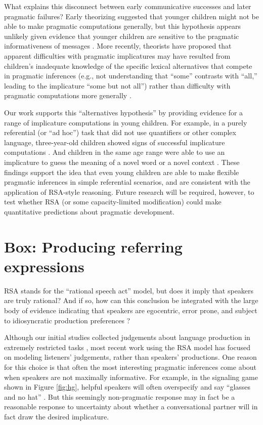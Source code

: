 \documentclass[]{elsarticle}
\begin{document}
What explains this disconnect between early communicative successes and
later pragmatic failures? Early theorizing suggested that younger
children might not be able to make pragmatic computations generally, but this hypothesis appears unlikely given evidence that
younger children are sensitive to the pragmatic informativeness of
messages \citep{katsos2011,oneill2001}. More
recently, theorists have proposed that apparent difficulties with
pragmatic implicatures may have resulted from children's inadequate
knowledge of the specific lexical alternatives that compete in pragmatic
inferences (e.g., not understanding that ``some'' contrasts with
``all,'' leading to the implicature ``some but not all'') rather than
difficulty with pragmatic computations more generally \citep{barner2011}.

Our work supports this ``alternatives hypothesis'' by providing evidence
for a range of implicature computations in young children. For example,
in a purely referential (or ``ad hoc'') task that did not use
quantifiers or other complex language, three-year-old children showed
signs of successful implicature computations \citep{stiller2015}. And children in the same age range were able to use an
implicature to guess the meaning of a novel word \citep{frank2014} or a novel context \citep{horowitz2016}. These findings support the idea that even young children are able
to make flexible pragmatic inferences in simple referential scenarios,
and are consistent with the application of RSA-style reasoning. Future
research will be required, however, to test whether RSA (or some
capacity-limited modification) could make quantitative predictions about
pragmatic development.

\section{Box: Producing referring expressions}\label{box-producing-referring-expressions}

RSA stands for the ``rational speech act'' model, but does it imply that
speakers are truly rational? And if so, how can this conclusion be
integrated with the large body of evidence indicating that speakers are
egocentric, error prone, and subject to idiosyncratic production
preferences \citep{keysar2003,lane2008,gatt2013}?

Although our initial studies collected judgements about language
production in extremely restricted tasks \citep{frank2012}, most
recent work using the RSA model has focused on modeling listeners'
judgements, rather than speakers' productions. One reason for this
choice is that often the most interesting pragmatic inferences come
about when speakers are not maximally informative. For example, in the
signaling game shown in Figure \ref{fig:hg}, helpful speakers will often
overspecify and say ``glasses and no hat'' \citep{bauman2014}. But this seemingly non-pragmatic response may in fact be a
reasonable response to uncertainty about whether a conversational
partner will in fact draw the desired implicature.
\end{document}
